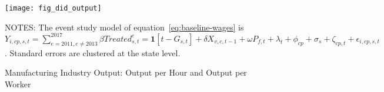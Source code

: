\begin{figure}[H]
    \centering
    \texttt{[image: fig\_did\_output]}
    \caption{Manufacturing Industry Output: Output per Hour and Output per Worker}
    \label{fig:baseline-industry-output}
    \begin{minipage}{12cm}
        \vspace{0.05in}
        NOTES: The event study model of equation~\ref{eq:baseline-wages} is $Y_{i,cp,s,t} = \sum_{{e = 2011},{e \neq 2013}}^{2017} \beta Treated_{s,t}^e = \textbf{1}[t - G_{s,t}] + \delta X_{v,c,t-1} + \omega P_{f,t} + \lambda_{t} + \phi_{cp} + \sigma_{s} + \zeta_{cp,t} + \epsilon_{i,cp,s,t}$. Standard errors are clustered at the state level.
    \end{minipage}
\end{figure}